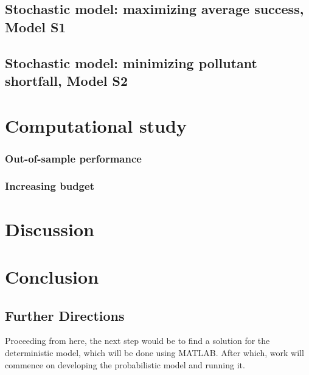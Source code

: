 \documentclass[preprint,12pt,authoryear]{elsarticle}
\begin{document}
\subsection{Stochastic model: maximizing average success, Model S1}

\subsection{Stochastic model: minimizing pollutant shortfall, Model S2}


\section{Computational study}
\subsubsection{Out-of-sample performance}
\subsubsection{Increasing budget}

\section{Discussion}

\section{Conclusion}

\subsection{Further Directions}
Proceeding from here, the next step would be to find a solution for the deterministic model, which will be done using MATLAB. After which, work will commence on developing the probabilistic model and running it. 
\end{document}
